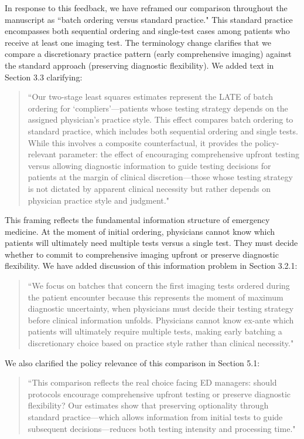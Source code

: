 \documentclass[11pt]{article}
\newcommand{\1}{\hbox{\rm 1\kern-.35em 1}}
\begin{document}
{In response to this feedback, we have reframed our comparison throughout the manuscript as ``batch ordering versus standard practice." This standard practice encompasses both sequential ordering and single-test cases among patients who receive at least one imaging test. The terminology change clarifies that we compare a discretionary practice pattern (early comprehensive imaging) against the standard approach (preserving diagnostic flexibility). We added text in Section 3.3 clarifying:

\begin{quote}
``Our two-stage least squares estimates represent the LATE of batch ordering for `compliers'---patients whose testing strategy depends on the assigned physician's practice style. This effect compares batch ordering to standard practice, which includes both sequential ordering and single tests. While this involves a composite counterfactual, it provides the policy-relevant parameter: the effect of encouraging comprehensive upfront testing versus allowing diagnostic information to guide testing decisions for patients at the margin of clinical discretion—those whose testing strategy is not dictated by apparent clinical necessity but rather depends on physician practice style and judgment."
\end{quote}

This framing reflects the fundamental information structure of emergency medicine. At the moment of initial ordering, physicians cannot know which patients will ultimately need multiple tests versus a single test. They must decide whether to commit to comprehensive imaging upfront or preserve diagnostic flexibility. We have added discussion of this information problem in Section 3.2.1:

\begin{quote}
``We focus on batches that concern the first imaging tests ordered during the patient encounter because this represents the moment of maximum diagnostic uncertainty, when physicians must decide their testing strategy before clinical information unfolds. Physicians cannot know ex-ante which patients will ultimately require multiple tests, making early batching a discretionary choice based on practice style rather than clinical necessity."
\end{quote}

We also clarified the policy relevance of this comparison in Section 5.1:

\begin{quote}
``This comparison reflects the real choice facing ED managers: should protocols encourage comprehensive upfront testing or preserve diagnostic flexibility? Our estimates show that preserving optionality through standard practice---which allows information from initial tests to guide subsequent decisions---reduces both testing intensity and processing time."
\end{quote}

}
\end{document}
